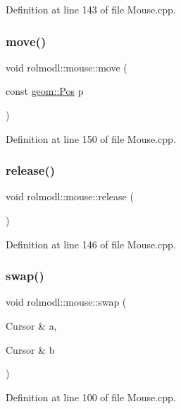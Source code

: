 Definition at line 143 of file Mouse.\+cpp.

\mbox{\label{namespacerolmodl_1_1mouse_a5a1885363a9ee21b07a9e57f86515af7}} 
\subsubsection{\texorpdfstring{move()}{move()}}
{\footnotesize\ttfamily void rolmodl\+::mouse\+::move (\begin{DoxyParamCaption}\item[{const \mbox{\hyperlink{structrolmodl_1_1geom_1_1_pos}{geom\+::\+Pos}}}]{p }\end{DoxyParamCaption})}



Definition at line 150 of file Mouse.\+cpp.

\mbox{\label{namespacerolmodl_1_1mouse_aaa124795794f16d0761dc57e6aa7d9bd}} 
\subsubsection{\texorpdfstring{release()}{release()}}
{\footnotesize\ttfamily void rolmodl\+::mouse\+::release (\begin{DoxyParamCaption}{ }\end{DoxyParamCaption})}



Definition at line 146 of file Mouse.\+cpp.

\mbox{\label{namespacerolmodl_1_1mouse_ad179b2d3502f48d5efa86ded16e3baf8}} 
\subsubsection{\texorpdfstring{swap()}{swap()}}
{\footnotesize\ttfamily void rolmodl\+::mouse\+::swap (\begin{DoxyParamCaption}\item[{Cursor \&}]{a,  }\item[{Cursor \&}]{b }\end{DoxyParamCaption})\hspace{0.3cm}{\ttfamily [noexcept]}}



Definition at line 100 of file Mouse.\+cpp.

